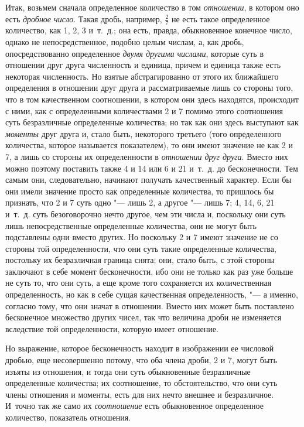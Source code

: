 Итак, возьмем сначала определенное количество в том
{\em отношении}, в котором оно есть
{\em дробное число}. Такая дробь, например, $\frac 2 7$
не есть такое определенное количество, как 1, 2, 3 и~т.~д.; она есть,
правда, обыкновенное конечное число, однако не непосредственное, подобно
целым числам, а, как дробь, опосредствованно определенное
{\em двумя другими числами}, которые суть в отношении
друг друга численность и единица, причем и единица также есть некоторая
численность. Но взятые абстрагированно от этого их ближайшего определения в
отношении друг друга и рассматриваемые лишь со стороны того, что в том
качественном соотношении, в котором они здесь находятся, происходит с ними,
как с определенными количествами 2 и 7 помимо этого соотношения суть
безразличные определенные количества; но так как они здесь выступают как
{\em моменты} друг друга и, стало быть, некоторого
третьего (того определенного количества, которое называется показателем),
то они имеют значение не как 2 и 7, а лишь со стороны их определенности в
{\em отношении друг друга}. Вместо них можно поэтому
поставить также 4 и 14 или 6 и 21 и~т.~д. до бесконечности. Тем самым они,
следовательно, начинают получать качественный характер. Если бы они имели
значение просто как определенные количества, то пришлось бы признать, что 2
и 7 суть одно "--- лишь 2, а другое "--- лишь 7; 4, 14, 6, 21 и~т.~д. суть
безоговорочно нечто другое, чем эти числа и, поскольку они суть лишь
непосредственные определенные количества, они не могут быть подставлены
одни вместо других. Но поскольку 2 и 7 имеют значение не со стороны той
определенности, что они суть такие определенные количества, постольку их
безразличная граница снята; они, стало быть, с этой стороны заключают в
себе момент бесконечности, ибо они не только как раз уже больше не суть то,
что они суть, а еще кроме того сохраняется их количественная
определенность, но как в себе сущая качественная определенность, "--- а
именно, согласно тому, что они значат в отношении. Вместо них может быть
поставлено бесконечное множество других чисел, так что величина дроби не
изменяется вследствие той определенности, которую имеет отношение.

Но выражение, которое бесконечность находит в изображении ее числовой
дробью, еще несовершенно потому, что оба члена дроби, 2 и 7, могут быть
изъяты из отношения, и тогда они суть обыкновенные безразличные
определенные количества; их соотношение, то обстоятельство, что они суть
члены отношения и моменты, есть для них нечто внешнее и безразличное.
И~точно так же само их {\em соотношение} есть
обыкновенное определенное количество, показатель отношения.

